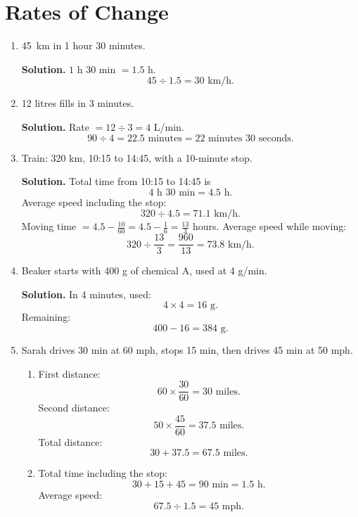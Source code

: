 \documentclass[12pt,a4paper]{article}
\begin{document}
\section*{Rates of Change}
\begin{enumerate}
\item \SI{45}{\kilo\metre} in 1 hour 30 minutes.

\textbf{Solution.} \(1\) h \(30\) min \(=1.5\) h.
\[
45\div1.5=30\text{ km/h}.
\]

\item 12 litres fills in 3 minutes.

\textbf{Solution.} Rate \(=12\div3=4\) L/min.
\[
90\div4=22.5\text{ minutes}=22\text{ minutes }30\text{ seconds}.
\]

\item Train: 320 km, 10:15 to 14:45, with a 10-minute stop.

\textbf{Solution.} Total time from 10:15 to 14:45 is
\[
4\text{ h }30\text{ min}=4.5\text{ h}.
\]
Average speed including the stop:
\[
320\div4.5=71.1\text{ km/h}.
\]
Moving time \(=4.5-\frac{10}{60}=4.5-\frac16=\frac{13}{3}\) hours.
Average speed while moving:
\[
320\div\frac{13}{3}=\frac{960}{13}=73.8\text{ km/h}.
\]

\item Beaker starts with 400 g of chemical A, used at 4 g/min.

\textbf{Solution.} In 4 minutes, used:
\[
4\times4=16\text{ g}.
\]
Remaining:
\[
400-16=384\text{ g}.
\]

\item Sarah drives 30 min at 60 mph, stops 15 min, then drives 45 min at 50 mph.

\begin{enumerate}[label=(\alph*)]
\item First distance:
\[
60\times\frac{30}{60}=30\text{ miles}.
\]
Second distance:
\[
50\times\frac{45}{60}=37.5\text{ miles}.
\]
Total distance:
\[
30+37.5=67.5\text{ miles}.
\]

\item Total time including the stop:
\[
30+15+45=90\text{ min}=1.5\text{ h}.
\]
Average speed:
\[
67.5\div1.5=45\text{ mph}.
\]
\end{enumerate}
\end{enumerate}
\end{document}
